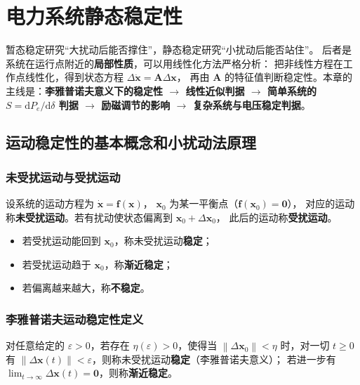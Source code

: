 
\chapter{电力系统静态稳定性}

暂态稳定研究“大扰动后能否撑住”，静态稳定研究“小扰动后能否站住”。
后者是系统在运行点附近的\textbf{局部性质}，可以用线性化方法严格分析：
把非线性方程在工作点线性化，得到状态方程 $\Delta\dot{\boldsymbol x}=\boldsymbol A\Delta\boldsymbol x$，
再由 $\boldsymbol A$ 的特征值判断稳定性。本章的主线是：\textbf{李雅普诺夫意义下的稳定性
$\to$ 线性近似判据 $\to$ 简单系统的 $S=\mathrm{d}P_e/\mathrm{d}\delta$ 判据
$\to$ 励磁调节的影响 $\to$ 复杂系统与电压稳定判据}。

\section{运动稳定性的基本概念和小扰动法原理}

\subsection{未受扰运动与受扰运动}

设系统的运动方程为 $\dot{\boldsymbol x}=\boldsymbol f(\boldsymbol x)$，
$\boldsymbol x_0$ 为某一平衡点（$\boldsymbol f(\boldsymbol x_0)=\boldsymbol 0$），
对应的运动称\textbf{未受扰运动}。若有扰动使状态偏离到 $\boldsymbol x_0+\Delta\boldsymbol x_0$，
此后的运动称\textbf{受扰运动}。
\begin{itemize}
  \item 若受扰运动能回到 $\boldsymbol x_0$，称未受扰运动\textbf{稳定}；
  \item 若受扰运动趋于 $\boldsymbol x_0$，称\textbf{渐近稳定}；
  \item 若偏离越来越大，称\textbf{不稳定}。
\end{itemize}

\subsection{李雅普诺夫运动稳定性定义}

对任意给定的 $\varepsilon>0$，若存在 $\eta(\varepsilon)>0$，使得当
$\left\|\Delta\boldsymbol x_0\right\|<\eta$ 时，对一切 $t\ge0$ 有
$\left\|\Delta\boldsymbol x(t)\right\|<\varepsilon$，则称未受扰运动\textbf{稳定}（李雅普诺夫意义）；
若进一步有 $\lim_{t\to\infty}\Delta\boldsymbol x(t)=\boldsymbol 0$，则称\textbf{渐近稳定}。

